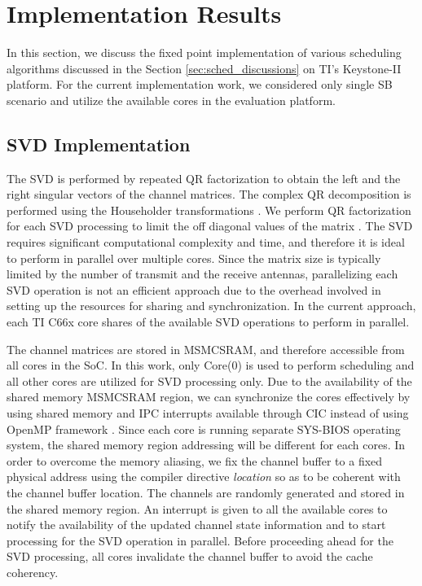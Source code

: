 \documentclass[conference,letterpaper]{./../../IEEE/IEEEtran}
\begin{document}
\section{Implementation Results}
\label{sec:implementation}
In this section, we discuss the fixed point implementation of various scheduling algorithms discussed in the Section \ref{sec:sched_discussions} on TI's Keystone-II platform. For the current implementation work, we considered only single SB scenario and utilize the available  cores in the evaluation platform. 

\subsection{SVD Implementation}
The SVD is performed by repeated QR factorization to obtain the left and the right singular vectors of the channel matrices. The complex QR decomposition is performed using the Householder transformations \cite{aft}. We perform  QR factorization for each SVD processing to limit the off diagonal values of the  matrix . The SVD requires significant computational complexity and time, and therefore it is ideal to perform in parallel over multiple cores. Since the matrix size is typically limited by the number of transmit and the receive antennas, parallelizing each SVD operation is not an efficient approach due to the overhead involved in setting up the resources for sharing and synchronization. In the current approach, each TI C66x core shares  of the available SVD operations to perform in parallel.
	
The channel matrices are stored in \ac{MSMCSRAM}, and therefore accessible from all cores in the \ac{SoC}. In this work, only Core(0) is used to perform scheduling and all other cores are utilized for SVD processing only. Due to the availability of the shared memory \ac{MSMCSRAM} region, we can synchronize the cores effectively by using shared memory and \ac{IPC} interrupts available through \ac{CIC} instead of using OpenMP framework \cite{openmp,ipc,cic}. Since each core is running separate SYS-BIOS operating system, the shared memory region addressing will be different for each cores. In order to overcome the memory aliasing, we fix the channel buffer to a fixed physical address using the compiler directive \textit{location} so as to be coherent with the channel buffer location. The channels are randomly generated and stored in the shared memory region. An interrupt is given to all the available cores to notify the availability of the updated channel state information and to start processing for the SVD operation in parallel. Before proceeding ahead for the SVD processing, all cores invalidate the channel buffer to avoid the cache coherency.
\end{document}
